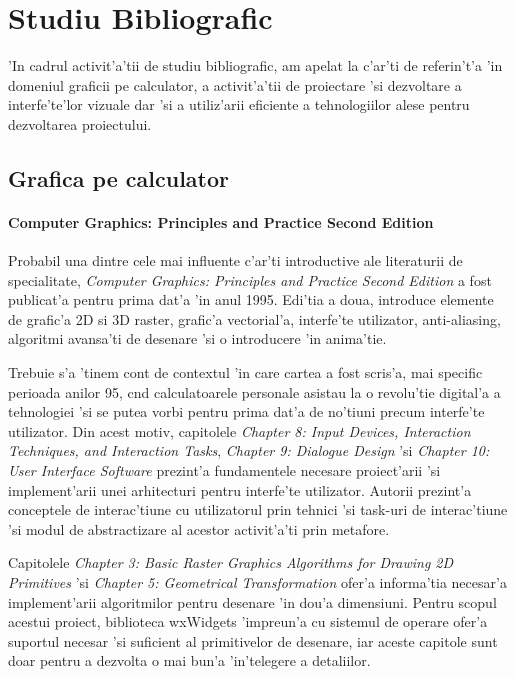 \chapter{Studiu Bibliografic}
\pagestyle{headings}

'In cadrul activit'a'tii de studiu bibliografic, am apelat la c'ar'ti de referin't'a 'in domeniul graficii pe calculator, a activit'a'tii de proiectare 'si dezvoltare a interfe'te'lor vizuale dar 'si a utiliz'arii eficiente a tehnologiilor alese pentru dezvoltarea proiectului.

\section{Grafica pe calculator}

\subsubsection{Computer Graphics: Principles and Practice Second Edition}

Probabil una dintre cele mai influente c'ar'ti introductive ale literaturii de specialitate, \emph{Computer Graphics: Principles and Practice Second Edition}\cite{computergraphics} a fost publicat'a pentru prima dat'a 'in anul 1995. Edi'tia a doua, introduce elemente de grafic'a 2D si 3D raster, grafic'a vectorial'a, interfe'te utilizator, anti-aliasing, algoritmi avansa'ti de desenare 'si o introducere 'in anima'tie.

\medskip

Trebuie s'a 'tinem cont de contextul 'in care cartea a fost scris'a, mai specific perioada anilor 95, c{\ia}nd calculatoarele personale asistau la o revolu'tie digital'a a tehnologiei 'si se putea vorbi pentru prima dat'a de no'tiuni precum interfe'te utilizator. Din acest motiv, capitolele \emph{Chapter 8: Input Devices, Interaction Techniques, and Interaction Tasks}, \emph{Chapter 9: Dialogue Design} 'si \emph{Chapter 10: User Interface Software} prezint'a fundamentele necesare proiect'arii 'si implement'arii unei arhitecturi pentru interfe'te utilizator. Autorii prezint'a conceptele de interac'tiune cu utilizatorul prin tehnici 'si task-uri de interac'tiune 'si modul de abstractizare al acestor activit'a'ti prin metafore.

\medskip

Capitolele \emph{Chapter 3: Basic Raster Graphics Algorithms for Drawing 2D Primitives} 'si \emph{Chapter 5: Geometrical Transformation} ofer'a informa'tia necesar'a implement'arii algoritmilor pentru desenare 'in dou'a dimensiuni. Pentru scopul acestui proiect, biblioteca wxWidgets 'impreun'a cu sistemul de operare ofer'a suportul necesar 'si suficient al primitivelor de desenare, iar aceste capitole sunt doar pentru a dezvolta o mai bun'a 'in'telegere a detaliilor.

